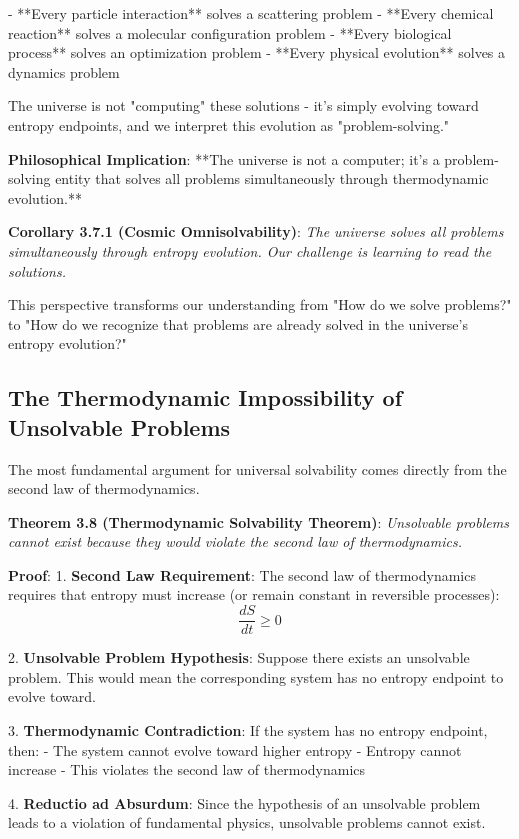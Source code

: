 \documentclass[12pt,a4paper]{article}
\theoremstyle{definition}
\begin{document}
- **Every particle interaction** solves a scattering problem
- **Every chemical reaction** solves a molecular configuration problem
- **Every biological process** solves an optimization problem
- **Every physical evolution** solves a dynamics problem

The universe is not "computing" these solutions - it's simply evolving toward entropy endpoints, and we interpret this evolution as "problem-solving."

\textbf{Philosophical Implication}: **The universe is not a computer; it's a problem-solving entity that solves all problems simultaneously through thermodynamic evolution.**

\textbf{Corollary 3.7.1 (Cosmic Omnisolvability)}: \textit{The universe solves all problems simultaneously through entropy evolution. Our challenge is learning to read the solutions.}

This perspective transforms our understanding from "How do we solve problems?" to "How do we recognize that problems are already solved in the universe's entropy evolution?"

\subsection{The Thermodynamic Impossibility of Unsolvable Problems}

The most fundamental argument for universal solvability comes directly from the second law of thermodynamics.

\textbf{Theorem 3.8 (Thermodynamic Solvability Theorem)}: \textit{Unsolvable problems cannot exist because they would violate the second law of thermodynamics.}

\textbf{Proof}:
1. \textbf{Second Law Requirement}: The second law of thermodynamics requires that entropy must increase (or remain constant in reversible processes):
   $$\frac{dS}{dt} \geq 0$$

2. \textbf{Unsolvable Problem Hypothesis}: Suppose there exists an unsolvable problem. This would mean the corresponding system has no entropy endpoint to evolve toward.

3. \textbf{Thermodynamic Contradiction}: If the system has no entropy endpoint, then:
   - The system cannot evolve toward higher entropy
   - Entropy cannot increase
   - This violates the second law of thermodynamics

4. \textbf{Reductio ad Absurdum}: Since the hypothesis of an unsolvable problem leads to a violation of fundamental physics, unsolvable problems cannot exist.
\end{document}
